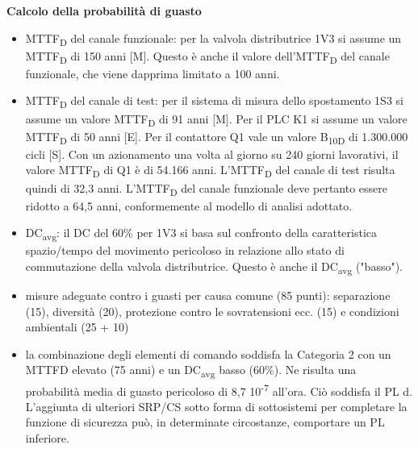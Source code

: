 \textbf{Calcolo della probabilità di guasto}
\begin{itemize}
    \item MTTF\textsubscript{D} del canale funzionale: per la valvola distributrice 1V3 si assume un MTTF\textsubscript{D} di 150 anni [M]. Questo è anche il valore dell'MTTF\textsubscript{D} del canale funzionale, che viene dapprima limitato a 100 anni.
    \item MTTF\textsubscript{D} del canale di test: per il sistema di misura dello spostamento 1S3 si assume un valore MTTF\textsubscript{D} di 91 anni [M]. Per il PLC K1 si assume un valore MTTF\textsubscript{D} di 50 anni [E]. Per il contattore Q1 vale un valore B\textsubscript{10D} di 1.300.000 cicli [S]. Con un azionamento una volta al giorno su 240 giorni lavorativi, il valore MTTF\textsubscript{D} di Q1 è di 54.166 anni. L'MTTF\textsubscript{D} del canale di test risulta quindi di 32,3 anni. L'MTTF\textsubscript{D} del canale funzionale deve pertanto essere ridotto a 64,5 anni, conformemente al modello di analisi adottato.
    \item DC\textsubscript{avg}: il DC del 60\% per 1V3 si basa sul confronto della caratteristica spazio/tempo del movimento pericoloso in relazione allo stato di commutazione della valvola distributrice. Questo è anche il DC\textsubscript{avg} ("basso").
    \item misure adeguate contro i guasti per causa comune (85 punti): separazione (15), diversità (20), protezione contro le sovratensioni ecc. (15) e condizioni ambientali (25 + 10)
    \item la combinazione degli elementi di comando soddisfa la Categoria 2 con un MTTFD elevato (75 anni) e un DC\textsubscript{avg} basso (60\%). Ne risulta una probabilità media di guasto pericoloso di 8,7 10\textsuperscript{-7} all'ora. Ciò soddisfa il PL d. L'aggiunta di ulteriori SRP/CS sotto forma di sottosistemi per completare la funzione di sicurezza può, in determinate circostanze, comportare un PL inferiore.
\end{itemize}

